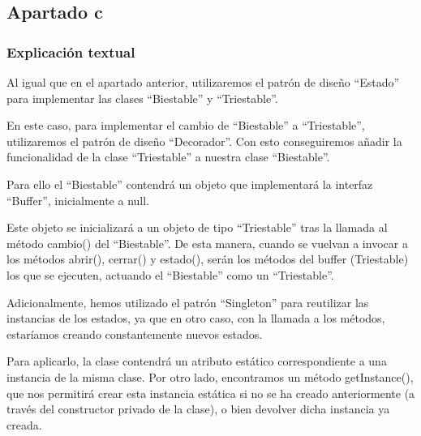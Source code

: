 \documentclass[11pt,a4paper]{article}
\begin{document}






\subsection{Apartado c}

\subsubsection{Explicación textual}
Al igual que en el apartado anterior, utilizaremos el patrón de diseño ``Estado'' para implementar las clases ``Biestable'' y ``Triestable''.

\vspace{0.25cm}

En este caso, para implementar el cambio de ``Biestable'' a ``Triestable'', utilizaremos el patrón de diseño ``Decorador''. Con esto conseguiremos añadir la funcionalidad de la clase ``Triestable'' a nuestra clase ``Biestable''.

\vspace{0.25cm}

Para ello el ``Biestable'' contendrá un objeto que implementará la interfaz ``Buffer'', inicialmente a null. 

\vspace{0.25cm}

Este objeto se inicializará a un objeto de tipo ``Triestable'' tras la llamada al método cambio() del ``Biestable''. De esta manera, cuando se vuelvan a invocar a los métodos abrir(), cerrar() y estado(), serán los métodos del buffer (Triestable) los que se ejecuten, actuando el ``Biestable'' como un ``Triestable''.

\vspace{0.25cm}

Adicionalmente, hemos utilizado el patrón “Singleton” para reutilizar las instancias de los estados, ya que en otro caso, con la llamada a los métodos, estaríamos creando constantemente nuevos estados.

\vspace{0.25cm}

Para aplicarlo, la clase contendrá un atributo estático correspondiente a una instancia de la misma clase. Por otro lado, encontramos un método getInstance(), que nos permitirá crear esta instancia estática si no se ha creado anteriormente (a través del constructor privado de la clase), o bien devolver dicha instancia ya creada.
\end{document}
